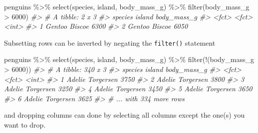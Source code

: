 \documentclass[
  12pt,
]{book}
\newenvironment{Shaded}{\begin{snugshade}}{\end{snugshade}}
\newcommand{\CommentTok}[1]{\textcolor[rgb]{0.56,0.35,0.01}{\textit{#1}}}
\newcommand{\DecValTok}[1]{\textcolor[rgb]{0.00,0.00,0.81}{#1}}
\newcommand{\FunctionTok}[1]{\textcolor[rgb]{0.00,0.00,0.00}{#1}}
\newcommand{\NormalTok}[1]{#1}
\newcommand{\SpecialCharTok}[1]{\textcolor[rgb]{0.00,0.00,0.00}{#1}}
\begin{document}
\begin{Shaded}
\begin{Highlighting}[]
\NormalTok{penguins }\SpecialCharTok{\%\textgreater{}\%} 
  \FunctionTok{select}\NormalTok{(species, island, body\_mass\_g) }\SpecialCharTok{\%\textgreater{}\%} 
  \FunctionTok{filter}\NormalTok{(body\_mass\_g }\SpecialCharTok{\textgreater{}} \DecValTok{6000}\NormalTok{)}
\CommentTok{\#\textgreater{} \# A tibble: 2 x 3}
\CommentTok{\#\textgreater{}   species island body\_mass\_g}
\CommentTok{\#\textgreater{}   \textless{}fct\textgreater{}   \textless{}fct\textgreater{}        \textless{}int\textgreater{}}
\CommentTok{\#\textgreater{} 1 Gentoo  Biscoe        6300}
\CommentTok{\#\textgreater{} 2 Gentoo  Biscoe        6050}
\end{Highlighting}
\end{Shaded}

Subsetting rows can be inverted by negating the \texttt{filter()} statement

\begin{Shaded}
\begin{Highlighting}[]
\NormalTok{penguins }\SpecialCharTok{\%\textgreater{}\%} 
  \FunctionTok{select}\NormalTok{(species, island, body\_mass\_g) }\SpecialCharTok{\%\textgreater{}\%} 
  \FunctionTok{filter}\NormalTok{(}\SpecialCharTok{!}\NormalTok{(body\_mass\_g }\SpecialCharTok{\textgreater{}} \DecValTok{6000}\NormalTok{))}
\CommentTok{\#\textgreater{} \# A tibble: 340 x 3}
\CommentTok{\#\textgreater{}   species island    body\_mass\_g}
\CommentTok{\#\textgreater{}   \textless{}fct\textgreater{}   \textless{}fct\textgreater{}           \textless{}int\textgreater{}}
\CommentTok{\#\textgreater{} 1 Adelie  Torgersen        3750}
\CommentTok{\#\textgreater{} 2 Adelie  Torgersen        3800}
\CommentTok{\#\textgreater{} 3 Adelie  Torgersen        3250}
\CommentTok{\#\textgreater{} 4 Adelie  Torgersen        3450}
\CommentTok{\#\textgreater{} 5 Adelie  Torgersen        3650}
\CommentTok{\#\textgreater{} 6 Adelie  Torgersen        3625}
\CommentTok{\#\textgreater{} \# ... with 334 more rows}
\end{Highlighting}
\end{Shaded}

and dropping columns can done by selecting all columns except the one(s) you want to drop.
\end{document}
